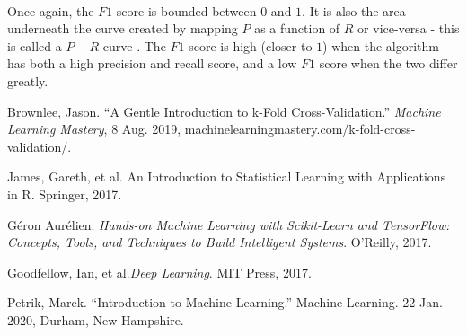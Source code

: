 \documentclass[12pt,letterpaper]{article}
\begin{document}
\paragraph*{}Once again, the $F1$ score is bounded between $0$ and $1$. It is also the area underneath the curve created by mapping $P$ as a function of $R$ or vice-versa - this is called a $P-R$ curve \cite{Goodfellow}. The $F1$ score is high (closer to $1$) when the algorithm has both a high precision and recall score, and a low $F1$ score when the two differ greatly.




\begin{thebibliography}{9}


Brownlee, Jason. “A Gentle Introduction to k-Fold Cross-Validation.” \textit{Machine Learning Mastery}, 8 Aug. 2019, machinelearningmastery.com/k-fold-cross-validation/.

James, Gareth, et al. {An Introduction to Statistical Learning with Applications in R}. Springer, 2017.

Géron Aurélien. \textit{Hands-on Machine Learning with Scikit-Learn and TensorFlow: Concepts, Tools, and Techniques to Build Intelligent Systems}. O'Reilly, 2017.

Goodfellow, Ian, et al.\textit{Deep Learning}. MIT Press, 2017.

Petrik, Marek. “Introduction to Machine Learning.” Machine Learning. 22 Jan. 2020, Durham, New Hampshire.

\end{thebibliography}

\end{document}
